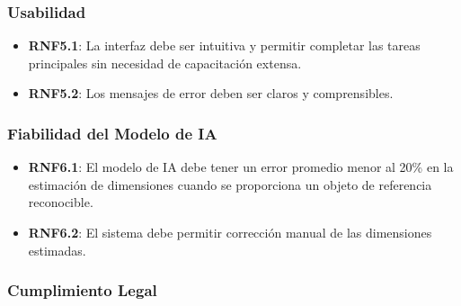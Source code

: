 \subsubsection{Usabilidad}

\begin{itemize}
    \item \textbf{RNF5.1}: La interfaz debe ser intuitiva y permitir completar las tareas principales sin necesidad de capacitación extensa.
    \item \textbf{RNF5.2}: Los mensajes de error deben ser claros y comprensibles.
\end{itemize}

\subsubsection{Fiabilidad del Modelo de IA}

\begin{itemize}
    \item \textbf{RNF6.1}: El modelo de IA debe tener un error promedio menor al 20\% en la estimación de dimensiones cuando se proporciona un objeto de referencia reconocible.
    \item \textbf{RNF6.2}: El sistema debe permitir corrección manual de las dimensiones estimadas.
\end{itemize}

\subsubsection{Cumplimiento Legal}

